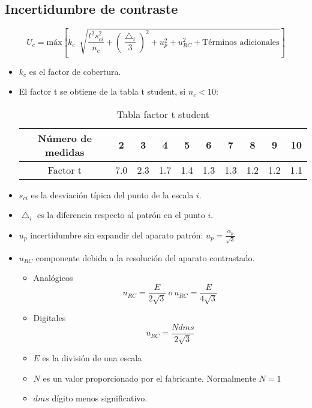 \subsection{Incertidumbre de contraste}
\[U_c = \text{máx} \left[{k_c \ \sqrt[]{\frac{t^2 s_{ci}^2}{n_c}+\left({\frac{\bigtriangleup_i}{3}}\right)^2+u_p^2+u_{RC}^2+\text{Términos adicionales}}}\right]\]

\begin{itemize}
\item $k_c$ es el factor de cobertura.

	\item El factor t se obtiene de la tabla t student, si $n_c < 10$:
\renewcommand{\arraystretch}{1.1} %
\begin{table}[H]
	\centering
	\begin{tabular}{|c|c|c|c|c|c|c|c|c|c|}
		\hline
		\textbf{Número de medidas} & \textbf{2} & \textbf{3} & \textbf{4} & \textbf{5} & \textbf{6} & \textbf{7}
		& \textbf{8} & \textbf{9} & \textbf{10} \\
		\hline
		Factor t& 7.0 & 2.3 & 1.7 & 1.4 & 1.3 & 1.3 & 1.2
		& 1.2 & 1.1  \\
		\hline 
	\end{tabular}
	\caption{Tabla factor t student}
	\label{tab:example}
\end{table}

\item $s_{ci}$ es la desviación típica del punto de la escala $i$.
\item $\bigtriangleup_i$ es la diferencia respecto al patrón en el punto $i$.
\item $u_p$ incertidumbre sin expandir del aparato patrón:  $u_p=\frac{\alpha_p}{\sqrt{3}}$

\item $u_{RC}$ componente debida a la resolución del aparato contrastado.
\begin{itemize}
	\item Analógicos
	\[u_{RC}=\frac{E}{2\sqrt{3}} \ o \ u_{RC}=\frac{E}{4\sqrt{3}}\]
	
	\item Digitales
	\[u_{RC}=\frac{N dms}{2\sqrt{3}}\]
	
	\item $E$ es la división de una escala
	\item $N$ es un valor proporcionado por el fabricante. Normalmente $N = 1$
	\item $dms$ dígito menos significativo. 
\end{itemize}
\end{itemize}



